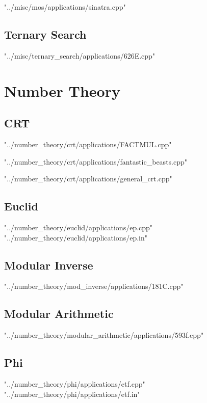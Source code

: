 \documentclass [12pt,onecolumn,oneside]{article}
\begin{document}
 {"../misc/mos/applications/sinatra.cpp"}
\newpage

\subsection{ Ternary Search}
 {"../misc/ternary_search/applications/626E.cpp"}
\newpage


\section{Number Theory}
\subsection{ CRT}
 {"../number_theory/crt/applications/FACTMUL.cpp"}
\newpage

 {"../number_theory/crt/applications/fantastic_beasts.cpp"}
\newpage

 {"../number_theory/crt/applications/general_crt.cpp"}
\newpage

\subsection{ Euclid}
 {"../number_theory/euclid/applications/ep.cpp"}
 {"../number_theory/euclid/applications/ep.in"}
\newpage

\subsection{ Modular Inverse}
 {"../number_theory/mod_inverse/applications/181C.cpp"}
\newpage

\subsection{ Modular Arithmetic}
 {"../number_theory/modular_arithmetic/applications/593f.cpp"}
\newpage

\subsection{ Phi}
 {"../number_theory/phi/applications/etf.cpp"}
 {"../number_theory/phi/applications/etf.in"}
\newpage
\end{document}
